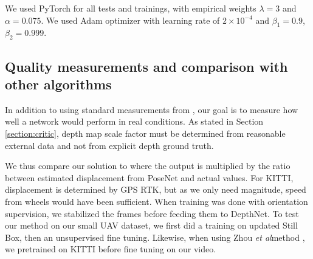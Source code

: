 \documentclass[runningheads]{llncs}
\def\etal{\emph{et al}\:}
\begin{document}
We used PyTorch \cite{paszke2017automatic} for all tests and trainings, with empirical weights $\lambda = 3$ and $\alpha = 0.075$. We used Adam optimizer \cite{DBLP:journals/corr/KingmaB14} with learning rate of 
$2 \times 10^{-4}$
and $\beta_1 = 0.9$, $\beta_2 = 0.999$.

\subsection{Quality measurements and comparison with other algorithms}
In addition to 
using
standard measurements from \cite{eigen2014depth}, our goal is to measure how well a network would perform in real conditions. As stated in Section \ref{section:critic}, depth map scale factor must be determined from reasonable external data and not from explicit depth ground truth.

We thus compare our solution to \cite{zhou2017unsupervised} where the output is multiplied by the ratio between estimated displacement from PoseNet and actual values. For KITTI, displacement is determined by GPS RTK, but as we only need magnitude, speed from wheels would have been sufficient. When training was done with orientation supervision, we stabilized the frames before feeding them to DepthNet.
To test our method on our small UAV dataset, we first did a training on updated Still Box, then an unsupervised fine tuning. Likewise, when using Zhou \etal method \cite{zhou2017unsupervised}, we pretrained on KITTI before fine tuning on our video.
\end{document}
